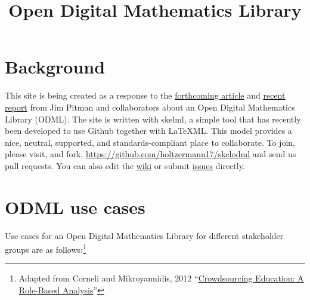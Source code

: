 \documentclass{article}
\begin{document}
\title{Open Digital Mathematics Library}

\maketitle

\section{Background}

This site is being created as a response to the  \href{http://www.mathunion.org/fileadmin/CEIC/planning_wdml.pdf}{forthcoming article} and
 \href{http://arxiv.org/abs/1404.1905}{recent report} from Jim Pitman and collaborators about an Open Digital Mathematics Library (ODML).
%
The site is written with skelml, a simple tool that has recently been developed to use Github together with \LaTeX ML.  This model provides a nice, neutral, supported, and standards-compliant place to collaborate.  To join, please visit, and fork, \url{https://github.com/holtzermann17/skelodml} and send us pull requests.  You can also edit the \href{https://github.com/holtzermann17/skelodml/wiki}{wiki} or
submit \href{https://github.com/holtzermann17/skelodml/issues}{issues} directly.

\section{ODML use cases}

Use cases for an Open Digital Mathematics Library for different stakeholder groups are as follows:\footnote{Adapted from Corneli and Mikroyannidis, 2012 ``\href{http://oro.open.ac.uk/33221/1/corneli_chap_okada_book.pdf}{Crowdsourcing Education: A Role-Based Analysis}''}
\end{document}
